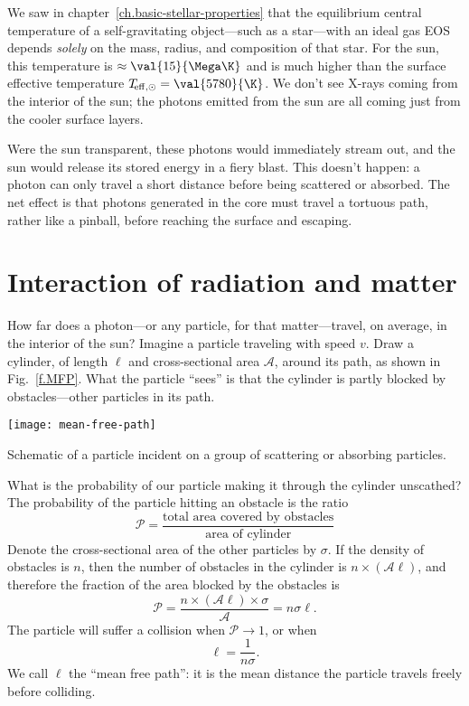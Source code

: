 
We saw in chapter~\ref{ch.basic-stellar-properties} that the equilibrium central temperature of a self-gravitating object---such as a star---with an ideal gas EOS depends \emph{solely} on the mass, radius, and composition of that star. For the sun, this temperature is $\approx \val{15}{\Mega\K}$ and is much higher than the surface effective temperature $T_{\!\mathrm{eff,\odot}} = \val{5780}{\K}$. We don't see X-rays coming from the interior of the sun; the photons emitted from the sun are all coming just from the cooler surface layers.

  Were the sun transparent, these photons would immediately stream out, and the sun would release its stored energy in a fiery blast.  This doesn't happen: a photon can only travel a short distance before being scattered or absorbed. The net effect is that photons generated in the core must travel a tortuous path, rather like a pinball, before reaching the surface and escaping.

\section{Interaction of radiation and matter}\label{s.interaction-radiation-matter}

How far does a photon---or any particle, for that matter---travel, on average, in the interior of the sun? Imagine a particle traveling with speed $v$.  Draw a cylinder, of length $\ell$ and cross-sectional area $\mathcal{A}$, around its path, as shown in Fig.~\ref{f.MFP}. What the particle ``sees'' is that the cylinder is partly blocked by obstacles---other particles in its path.
\begin{marginfigure}
    \texttt{[image: mean-free-path]}
    \caption[Schematic of mean free path]{\label{f.MFP} Schematic of a particle incident on a group of scattering or absorbing particles.}
\end{marginfigure}
What is the probability of our particle making it through the cylinder unscathed? The probability of the particle hitting an obstacle is the ratio
\[
    \mathcal{P} = \frac{\textrm{total area covered by obstacles}}{\textrm{area of cylinder}}
\]
Denote the cross-sectional area of the other particles by $\sigma$. If the density of obstacles is $n$, then the number of obstacles in the cylinder is $n\times(\mathcal{A}\ell)$, and therefore the fraction of the area blocked by the obstacles is
\begin{equation}
    \mathcal{P} = \frac{n\times(\mathcal{A}\ell)\times\sigma}{\mathcal{A}} = n\sigma\ell.
\label{e.prob-MFP}
\end{equation}
The particle will suffer a collision when $\mathcal{P}\to 1$, or when
\begin{equation}\label{e.MFP}
    \ell = \frac{1}{n\sigma}.
\end{equation}
We call $\ell$ the ``mean free path'': it is the mean distance the particle travels freely before colliding.


